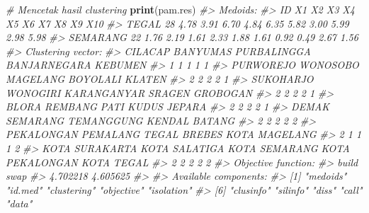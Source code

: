 \documentclass[
  oneside]{book}
\newenvironment{Shaded}{\begin{snugshade}}{\end{snugshade}}
\newcommand{\CommentTok}[1]{\textcolor[rgb]{0.56,0.35,0.01}{\textit{#1}}}
\newcommand{\FunctionTok}[1]{\textcolor[rgb]{0.13,0.29,0.53}{\textbf{#1}}}
\newcommand{\NormalTok}[1]{#1}
\begin{document}
\begin{Shaded}
\begin{Highlighting}[]
\CommentTok{\# Mencetak hasil clustering}
\FunctionTok{print}\NormalTok{(pam.res)}
\CommentTok{\#\textgreater{} Medoids:}
\CommentTok{\#\textgreater{}          ID   X1   X2   X3   X4   X5   X6   X7   X8   X9  X10}
\CommentTok{\#\textgreater{} TEGAL    28 4.78 3.91 6.70 4.84 6.35 5.82 3.00 5.99 2.98 5.98}
\CommentTok{\#\textgreater{} SEMARANG 22 1.76 2.19 1.61 2.33 1.88 1.61 0.92 0.49 2.67 1.56}
\CommentTok{\#\textgreater{} Clustering vector:}
\CommentTok{\#\textgreater{}         CILACAP        BANYUMAS     PURBALINGGA    BANJARNEGARA         KEBUMEN }
\CommentTok{\#\textgreater{}               1               1               1               1               1 }
\CommentTok{\#\textgreater{}       PURWOREJO        WONOSOBO        MAGELANG        BOYOLALI          KLATEN }
\CommentTok{\#\textgreater{}               2               2               2               2               1 }
\CommentTok{\#\textgreater{}       SUKOHARJO        WONOGIRI     KARANGANYAR          SRAGEN        GROBOGAN }
\CommentTok{\#\textgreater{}               2               2               2               2               1 }
\CommentTok{\#\textgreater{}           BLORA         REMBANG            PATI           KUDUS          JEPARA }
\CommentTok{\#\textgreater{}               2               2               2               2               1 }
\CommentTok{\#\textgreater{}         DEMAK          SEMARANG      TEMANGGUNG          KENDAL          BATANG }
\CommentTok{\#\textgreater{}               2               2               2               2               2 }
\CommentTok{\#\textgreater{}      PEKALONGAN        PEMALANG           TEGAL          BREBES   KOTA MAGELANG }
\CommentTok{\#\textgreater{}               2               1               1               1               2 }
\CommentTok{\#\textgreater{}  KOTA SURAKARTA   KOTA SALATIGA   KOTA SEMARANG KOTA PEKALONGAN      KOTA TEGAL }
\CommentTok{\#\textgreater{}               2               2               2               2               2 }
\CommentTok{\#\textgreater{} Objective function:}
\CommentTok{\#\textgreater{}    build     swap }
\CommentTok{\#\textgreater{} 4.702218 4.605625 }
\CommentTok{\#\textgreater{} }
\CommentTok{\#\textgreater{} Available components:}
\CommentTok{\#\textgreater{}  [1] "medoids"    "id.med"     "clustering" "objective"  "isolation" }
\CommentTok{\#\textgreater{}  [6] "clusinfo"   "silinfo"    "diss"       "call"       "data"}
\end{Highlighting}
\end{Shaded}
\end{document}
